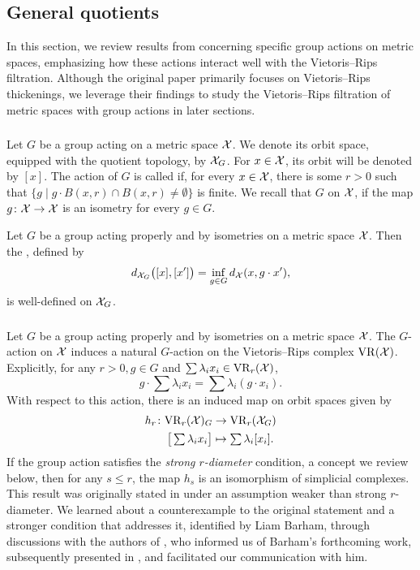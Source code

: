 
\subsection{General quotients}

In this section, we review results from \cite{adams2022metric} concerning specific group actions on metric spaces, emphasizing how these actions interact well with the Vietoris--Rips filtration.
Although the original paper primarily focuses on Vietoris--Rips thickenings, we leverage their findings to study the Vietoris--Rips filtration of metric spaces with group actions in later sections.

\subsubsection{}

Let $G$ be a group acting on a metric space $\mathcal{X}$.
We denote its orbit space, equipped with the quotient topology, by $\mathcal{X}_G$.
For $x \in \mathcal{X}$, its orbit will be denoted by $[x]$.
The action of $G$ is called  if, for every $x \in \mathcal{X}$, there is some $r > 0$ such that $\{g \mid g\cdot B(x,r) \cap B(x,r) \neq \emptyset\}$ is finite.
We recall that $G$  on $\mathcal{X}$, if the map $g \colon \mathcal{X} \to \mathcal{X}$ is an isometry for every $g \in G$.

Let $G$ be a group acting properly and by isometries on a metric space $\mathcal{X}$.
Then the , defined by
\[
d_{\mathcal{X}_G}\big([x], [x']\big) = \inf_{g \in G} d_{\mathcal{X}}(x, g \cdot x'),
\]
is well-defined on $\mathcal{X}_G$.

\subsubsection{}\label{ss:h}

Let $G$ be a group acting properly and by isometries on a metric space $\mathcal{X}$.
The \(G\)-action on $\mathcal{X}$ induces a natural \(G\)-action on the Vietoris--Rips complex $\mathrm{VR}(\mathcal{X})$.
Explicitly, for any \(r > 0, g\in G\) and $\sum \lambda_i x_i \in \mathrm{VR}_r(\mathcal{X})$,
\[
g \cdot \sum \lambda_i x_i = \sum \lambda_i (g \cdot x_i).
\]
With respect to this action, there is an induced map on orbit spaces given by
\begin{align*}
	h_r \colon \mathrm{VR}_r(\mathcal{X})_G &\to  \mathrm{VR}_r(\mathcal{X}_G) \\
	 \textstyle \big[\sum\lambda_i x_i\big] & \mapsto \textstyle\sum\lambda_i [x_i].
\end{align*}
If the group action satisfies the \textit{strong \(r\)-diameter} condition, a concept we review below, then for any \(s \leq r\), the map $h_s$ is an isomorphism of simplicial complexes.
This result was originally stated in \cite[Proposition~3.5]{adams2022metric} under an assumption weaker than strong \(r\)-diameter.
We learned about a counterexample to the original statement and a stronger condition that addresses it, identified by Liam Barham, through discussions with the authors of \cite{adams2022metric}, who informed us of Barham's forthcoming work, subsequently presented in \cite{barham2025group}, and facilitated our communication with him.

